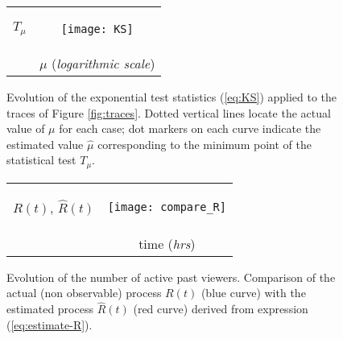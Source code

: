 \documentclass[twoside]{article}
\begin{document}
\begin{figure}[h]
\centering
\hspace*{-2mm}\begin{tabular}{cc}
\begin{turn}{90}{\hspace*{14mm}$T_{\mu}$} \end{turn} &
\hspace*{-3mm}\texttt{[image: KS]} \\[-1mm]
& $\mu$ ({\em logarithmic scale}) \\
\end{tabular}
\caption{\small Evolution of the exponential test statistics (\ref{eq:KS}) applied to the traces of Figure \ref{fig:traces}. Dotted vertical lines locate the actual value of $\mu$ for each case;  dot markers on each curve indicate the estimated value $\widehat{\mu}$ corresponding to the minimum point of the statistical test $T_{\mu}$. }
\label{fig:KS}
\end{figure}

\begin{figure}[h]
\centering
\hspace*{-2mm}\begin{tabular}{cc}
\begin{turn}{90} \hspace*{8mm} $R(t)$, $\widehat{R}(t)$ \end{turn} & 
\hspace*{-3mm}\texttt{[image: compare\_R]} \\[-1mm]
& time ({\em hrs}) \\
\end{tabular}
\caption{\small Evolution of the number of active past viewers. Comparison of the actual (non observable) process $R(t)$ (blue curve) with the estimated process $\widehat{R}(t)$ (red curve) derived from  expression (\ref{eq:estimate-R}).}
\label{fig:R}
\end{figure}
\end{document}
